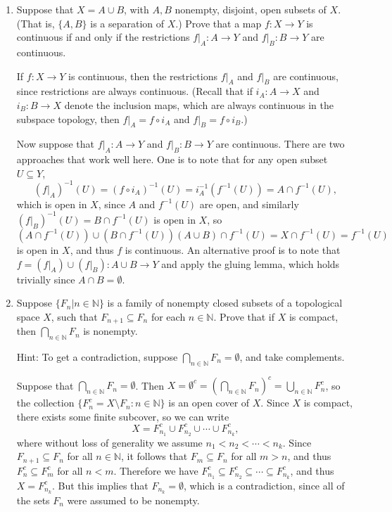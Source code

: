 \documentclass[12pt]{article}
\newcommand{\points}[1]{\marginpar{\hspace{24pt}[#1]}}
\newcommand{\N}{\mathbb{N}}
\begin{document}
\begin{enumerate}
\bigskip

 \item Suppose that $X=A\cup B$, with $A,B$ nonempty, disjoint, open subsets of $X$. (That is, $\{A,B\}$ is a separation of $X$.) Prove that a map $f:X\to Y$ is continuous if and only if the restrictions $f|_A:A\to Y$ and $f|_B:B\to Y$ are continuous. \points{5}

\bigskip

If $f:X\to Y$ is continuous, then the restrictions $f|_A$ and $f|_B$ are continuous, since restrictions are always continuous. (Recall that if $i_A:A\to X$ and $i_B:B\to X$ denote the inclusion maps, which are always continuous in the subspace topology, then $f|_A = f\circ i_A$ and $f|_B = f\circ i_B$.)

Now suppose that $f|_A:A\to Y$ and $f|_B:B\to Y$ are continuous. There are two approaches that work well here. One is to note that for any open subset $U\subseteq Y$, 
\[
(f|_A)^{-1}(U) = (f\circ i_A)^{-1}(U) = i_A^{-1}(f^{-1}(U)) = A\cap f^{-1}(U), 
\]
which is open in $X$, since $A$ and $f^{-1}(U)$ are open, and similarly $(f|_B)^{-1}(U) = B\cap f^{-1}(U)$ is open in $X$, so 
\[
 (A\cap f^{-1}(U))\cup (B\cap f^{-1}(U)) (A\cup B)\cap f^{-1}(U) = X\cap f^{-1}(U) = f^{-1}(U)
\]
is open in $X$, and thus $f$ is continuous. An alternative proof is to note that $f = (f|_A)\cup (f|_B):A\cup B\to Y$ and apply the gluing lemma, which holds trivially since $A\cap B = \emptyset$.

\newpage

 \item Suppose $\{F_n | n\in\N\}$ is a family of nonempty closed subsets of a topological space $X$, such that $F_{n+1}\subseteq F_n$ for each $n\in \N$. Prove that if $X$ is compact, then $\bigcap_{n\in\N}F_n$ is nonempty. \points{6}

Hint: To get a contradiction, suppose $\bigcap_{n\in\N}F_n = \emptyset$, and take complements.

 \bigskip

Suppose that $\bigcap_{n\in\N}F_n = \emptyset$. Then $X = \emptyset^c = \left(\bigcap_{n\in\N}F_n\right)^c = \bigcup_{n\in \N}F_n^c$, so the collection $\{F_n^c = X\setminus F_n : n\in\N\}$ is an open cover of $X$. Since $X$ is compact, there exists some finite subcover, so we can write
\[
 X = F_{n_1}^c\cup F_{n_2}^c\cup\cdots\cup F_{n_k}^c,
\]
where without loss of generality we assume $n_1<n_2<\cdots <n_k$. Since $F_{n+1}\subseteq F_n$ for all $n\in \N$, it follows that $F_m\subseteq F_n$ for all $m>n$, and thus $F_n^c\subseteq F_m^c$ for all $n<m$. Therefore we have $F_{n_1}^c\subseteq F_{n_2}^c\subseteq \cdots\subseteq F_{n_k}^c$, and thus $X = F_{n_k}^c$. But this implies that $F_{n_k}=\emptyset$, which is a contradiction, since all of the sets $F_n$ were assumed to be nonempty.


\end{enumerate}
\end{document}
